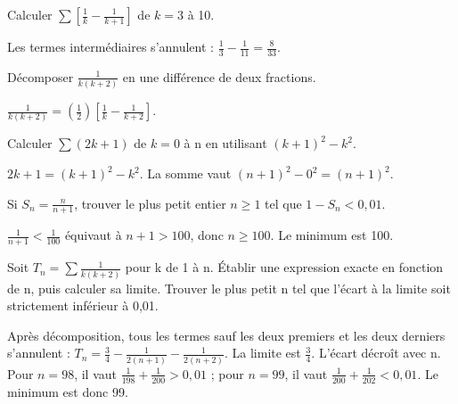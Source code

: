 \documentclass[11pt]{article}
\begin{document}
Calculer \(\sum [\frac{1}{k}-\frac{1}{k+1}]\) de \(k=3\) à 10.\par
Les termes intermédiaires s’annulent : \(\frac{1}{3}-\frac{1}{11}=\frac{8}{33}\).\par
{}
Décomposer \(\frac{1}{k(k+2)}\) en une différence de deux fractions.\par
\(\frac{1}{k(k+2)}=(\frac{1}{2})[\frac{1}{k}-\frac{1}{k+2}]\).\par
{}
Calculer \(\sum (2k+1)\) de \(k=0\) à n en utilisant \((k+1)^{2}-k^{2}\).\par
\(2k+1=(k+1)^{2}-k^{2}\). La somme vaut \((n+1)^{2}-0^{2}=(n+1)^{2}\).\par
{}
Si \(S_{n}=\frac{n}{n+1}\), trouver le plus petit entier \(n\geq 1\) tel que \(1-S_{n}<0,01\).\par
\(\frac{1}{n+1}<\frac{1}{100}\) équivaut à \(n+1>100\), donc \(n\geq 100\). Le minimum est 100.\par
{}
Soit \(T_{n}=\sum  \frac{1}{k(k+2)}\) pour k de 1 à n. Établir une expression exacte en fonction de n, puis calculer sa limite. Trouver le plus petit n tel que l’écart à la limite soit strictement inférieur à 0,01.\par
Après décomposition, tous les termes sauf les deux premiers et les deux derniers s’annulent : \(T_{n}=\frac{3}{4}-\frac{1}{2(n+1)}-\frac{1}{2(n+2)}\). La limite est \(\frac{3}{4}\). L’écart décroît avec n. Pour \(n=98\), il vaut \(\frac{1}{198}+\frac{1}{200}>0,01\) ; pour \(n=99\), il vaut \(\frac{1}{200}+\frac{1}{202}<0,01\). Le minimum est donc 99.\par
\end{document}

